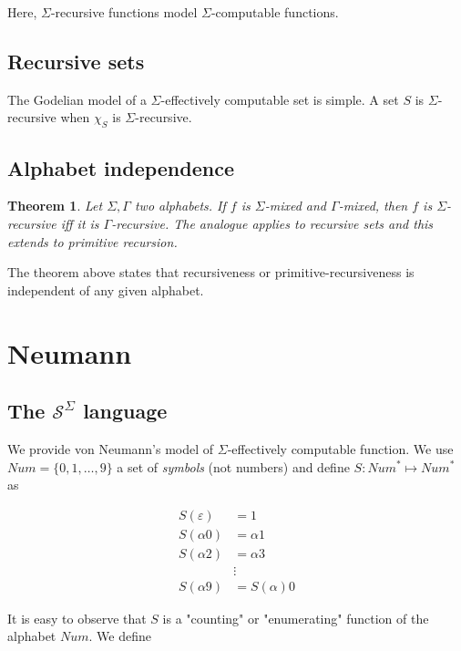 \documentclass[a4paper, 12pt]{article}
\newtheorem{theorem}{Theorem}
\newtheorem{theorem}{Theorem}
\begin{document}
Here, $\Sigma$-recursive functions model $\Sigma$-computable functions.

\subsection{Recursive sets}

The Godelian model of a $\Sigma$-effectively computable set is simple. A set $S$
is $\Sigma$-recursive when $\chi_{S}$ is $\Sigma$-recursive.

\subsection{Alphabet independence}

\begin{theorem} Let $\Sigma, \Gamma$ two alphabets. If $f$ is $\Sigma$-mixed and
$\Gamma$-mixed, then $f$ is $\Sigma$-recursive iff it is $\Gamma$-recursive. The
analogue applies to recursive sets and this extends to primitive recursion.
\end{theorem}

The theorem above states that recursiveness or primitive-recursiveness is
independent of any given alphabet.


\pagebreak 

\section{Neumann}

\subsection{The $\mathcal{S}^{\Sigma}$ language}

We provide von Neumann's model of $\Sigma$-effectively computable function. We
use $Num = \{0, 1, \ldots, 9\}$ a set of \textit{symbols} (not numbers) and
define $S : Num^{*} \mapsto Num^{*}$ as 

\begin{align*}
    S(\varepsilon) &= 1 \\
    S(\alpha 0) &= \alpha 1 \\
    S(\alpha 2) &= \alpha 3 \\
                &\vdots \\ 
    S(\alpha 9) &= S(\alpha) 0
\end{align*}

It is easy to observe that $S$ is a "counting" or "enumerating" function of the
alphabet $Num$. We define 
\end{document}
